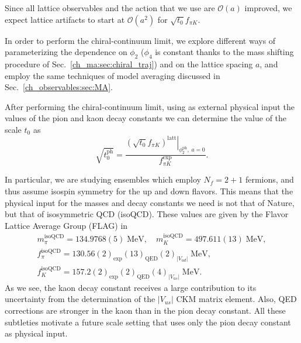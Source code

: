 Since all lattice observables and the action that we use are $\mathcal{O}(a)$ improved, we expect lattice artifacts to start at $\mathcal{O}(a^2)$ for $\sqrt{t_0}f_{\pi K}$.

In order to perform the chiral-continuum limit, we explore different ways of parameterizing the dependence on $\phi_2$ ($\phi_4$ is constant thanks to the mass shifting procedure of Sec.~\ref{ch_ma:sec:chiral_traj}) and on the lattice spacing $a$, and employ the same techniques of model averaging discussed in Sec.~\ref{ch_observables:sec:MA}.

After performing the chiral-continuum limit, using as external physical input the values of the pion and kaon decay constants we can determine the value of the scale $t_0$ as
\begin{equation}
\sqrt{t_0^{\textrm{ph}}}=\frac{\left.\left(\sqrt{t_0}f_{\pi K}\right)^{\textrm{latt}}\right|_
{\phi_2^{\textrm{ph}},\;a=0}}{f_{\pi K}^{\textrm{exp}}}.
\end{equation}

In particular, we are studying ensembles which employ $N_f=2+1$ fermions, and thus assume isospin symmetry for the up and down flavors. This means that the physical input for the masses and decay constants we need is not that of Nature, but that of isosymmetric QCD (isoQCD). These values are given by the Flavor Lattice Average Group (FLAG) in~\citep{FlavourLatticeAveragingGroupFLAG:2021npn}
\begin{gather}
\label{ch_ss:eq:isoQCD}
m_{\pi}^{\textrm{isoQCD}}=134.9768(5)\;{\textrm{MeV}}, \quad
m_{K}^{\textrm{isoQCD}}=497.611(13)\;{\textrm{MeV}}, \\
\label{ch_ss:eq:isoQCD_fpi}
f_{\pi}^{\textrm{isoQCD}}=130.56(2)_{\textrm{exp}}(13)_{\textrm{QED}}(2)_{|V_{ud}|}\;{\textrm{MeV}}, \quad \\
\label{ch_ss:eq:isoQCD_fk}
f_{K}^{\textrm{isoQCD}}=157.2(2)_{\textrm{exp}}(2)_{\textrm{QED}}(4)_{|V_{us}|}\;{\textrm{MeV}}.
\end{gather} 
As we see, the kaon decay constant receives a large contribution to its uncertainty from the determination of the $|V_{us}|$ CKM matrix element. Also, QED corrections are stronger in the kaon than in the pion decay constant. All these subtleties motivate a future scale setting that uses only the pion decay constant as physical input. 



